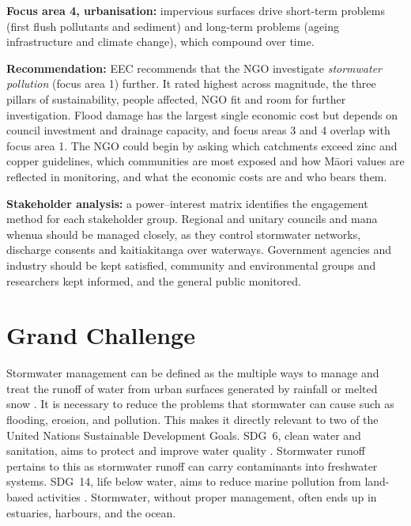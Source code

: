\documentclass[11pt,a4paper]{article}
\begin{document}
\textbf{Focus area 4, urbanisation:} impervious surfaces drive short-term problems (first flush pollutants and sediment) and long-term problems (ageing infrastructure and climate change), which compound over time.

\textbf{Recommendation:} EEC recommends that the NGO investigate \emph{stormwater pollution} (focus area 1) further. It rated highest across magnitude, the three pillars of sustainability, people affected, NGO fit and room for further investigation. Flood damage has the largest single economic cost but depends on council investment and drainage capacity, and focus areas 3 and 4 overlap with focus area 1. The NGO could begin by asking which catchments exceed zinc and copper guidelines, which communities are most exposed and how M\=aori values are reflected in monitoring, and what the economic costs are and who bears them.

\textbf{Stakeholder analysis:} a power--interest matrix identifies the engagement method for each stakeholder group. Regional and unitary councils and mana whenua should be managed closely, as they control stormwater networks, discharge consents and kaitiakitanga over waterways. Government agencies and industry should be kept satisfied, community and environmental groups and researchers kept informed, and the general public monitored.

\clearpage

\renewcommand{\contentsname}{Table of Contents}
\tableofcontents
\clearpage


\section{Grand Challenge}

Stormwater management can be defined as the multiple ways to manage and treat the runoff of water from urban surfaces generated by rainfall or melted snow \citep{esnz_intro}. It is necessary to reduce the problems that stormwater can cause such as flooding, erosion, and pollution. This makes it directly relevant to two of the United Nations Sustainable Development Goals. SDG~6, clean water and sanitation, aims to protect and improve water quality \citep{un_goal6}. Stormwater runoff pertains to this as stormwater runoff can carry contaminants into freshwater systems. SDG~14, life below water, aims to reduce marine pollution from land-based activities \citep{un_goal14}. Stormwater, without proper management, often ends up in estuaries, harbours, and the ocean.
\end{document}
